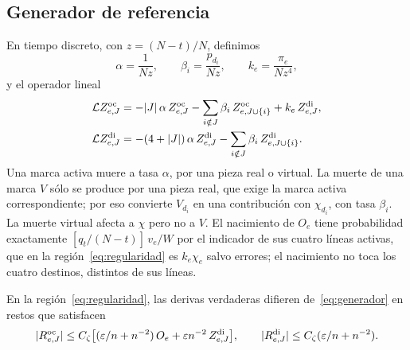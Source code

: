 \subsection{Generador de referencia}

En tiempo discreto, con $z=(N-t)/N$, definimos
\[
 \alpha=\frac1{Nz},\qquad \beta_i=\frac{p_{d_i}}{Nz},\qquad k_e=\frac{\pi_e}{Nz^4},
\]
y el operador lineal
\begin{equation}\label{eq:generador}
\begin{aligned}
 \mathcal{L}
Z^{\mathrm{oc}}_{e,J}&=-|J|\,\alpha\,Z^{\mathrm{oc}}_{e,J}-\sum_{i\notin J}\beta_i\,Z^{\mathrm{oc}}_{e,J\cup\{i\}}+k_e\,Z^{\mathrm{di}}_{e,J},\\
 \mathcal{L} Z^{\mathrm{di}}_{e,J}&=-(4+|J|)\,\alpha\,Z^{\mathrm{di}}_{e,J}-\sum_{i\notin J}\beta_i\,Z^{\mathrm{di}}_{e,J\cup\{i\}} .
\end{aligned}
\end{equation}
Una marca activa muere a tasa $\alpha$, por una pieza real o virtual. La muerte de una marca $V$
sólo se produce por una pieza real, que exige la marca activa correspondiente; por eso convierte
$V_{d_i}$ en una contribución con $\chi_{d_i}$, con tasa $\beta_i$. La muerte virtual afecta a
$\chi$ pero no a $V$. El nacimiento de $O_e$ tiene probabilidad exactamente
$[q_t/(N-t)]\,v_e/W$ por el indicador de sus cuatro líneas activas, que en la región~\eqref{eq:regularidad}
es
$k_e\chi_e$ salvo errores; el nacimiento no toca los cuatro destinos, distintos de sus líneas.

\begin{lema}\label{lem:generador}
En la región~\eqref{eq:regularidad}, las derivas verdaderas difieren de~\eqref{eq:generador} en
restos que satisfacen
\[
 |R^{\mathrm{oc}}_{e,J}|\le C_\zeta\bigl[(\varepsilon/n+n^{-2})\,O_e+\varepsilon n^{-2}\,Z^{\mathrm{di}}_{e,J}\bigr],\qquad
 |R^{\mathrm{di}}_{e,J}|\le C_\zeta(\varepsilon/n+n^{-2}).
\]
\end{lema}

